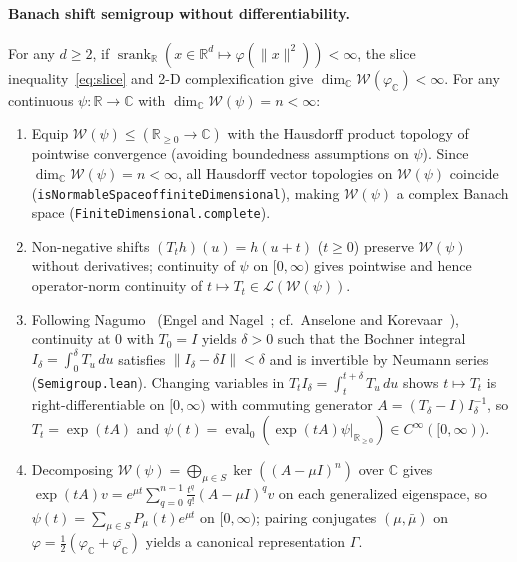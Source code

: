 \documentclass[11pt,a4paper]{article}
\theoremstyle{plain}
\theoremstyle{definition}
\newcommand{\R}{\mathbb{R}}
\newcommand{\C}{\mathbb{C}}
\newcommand{\Rnn}{\mathbb{R}_{\ge 0}}
\DeclareMathOperator{\srank}{srank}
\DeclareRobustCommand{\leanid}[1]{{\def\_{\textunderscore\allowbreak}\texttt{#1}}}
\begin{document}
\paragraph{Banach shift semigroup without differentiability.}
For any $d \ge 2$, if $\srank_{\R}(x \in \R^d \mapsto \varphi(\|x\|^2)) < \infty$, the slice inequality~\eqref{eq:slice} and 2-D complexification give $\dim_{\C}\mathcal{W}(\varphi_{\C}) < \infty$. For any continuous $\psi : \R \to \C$ with $\dim_{\C}\mathcal{W}(\psi) = n < \infty$:
\begin{enumerate}[leftmargin=2em,itemsep=2pt]
  \item Equip $\mathcal{W}(\psi) \le (\Rnn \to \C)$ with the Hausdorff product topology of pointwise convergence (avoiding boundedness assumptions on $\psi$). Since $\dim_{\C}\mathcal{W}(\psi) = n < \infty$, all Hausdorff vector topologies on $\mathcal{W}(\psi)$ coincide (\leanid{isNormableSpace\_of\_finiteDimensional}), making $\mathcal{W}(\psi)$ a complex Banach space (\leanid{FiniteDimensional.complete}).
  \item Non-negative shifts $(T_t h)(u) = h(u + t)$ ($t \ge 0$) preserve $\mathcal{W}(\psi)$ without derivatives; continuity of $\psi$ on $[0,\infty)$ gives pointwise and hence operator-norm continuity of $t \mapsto T_t \in \mathcal{L}(\mathcal{W}(\psi))$.
  \item Following Nagumo~\cite{nagumo1936einige} (Engel and Nagel~\cite[Thm.~I.3.7]{engel2000one}; cf.\ Anselone and Korevaar~\cite[p.~750]{anselone1964}), continuity at $0$ with $T_0 = I$ yields $\delta > 0$ such that the Bochner integral $I_\delta = \int_0^\delta T_u\,du$ satisfies $\|I_\delta - \delta I\| < \delta$ and is invertible by Neumann series (\texttt{Semigroup.lean}). Changing variables in $T_t I_\delta = \int_t^{t+\delta} T_u\,du$ shows $t \mapsto T_t$ is right-differentiable on $[0,\infty)$ with commuting generator $A = (T_\delta - I)I_\delta^{-1}$, so $T_t = \exp(tA)$ and $\psi(t) = \operatorname{eval}_0(\exp(tA)\psi|_{\Rnn}) \in C^\infty([0,\infty))$.
  \item Decomposing $\mathcal{W}(\psi) = \bigoplus_{\mu \in S} \ker((A - \mu I)^n)$ over $\C$ gives $\exp(tA)v = e^{\mu t}\sum_{q=0}^{n-1} \frac{t^q}{q!}(A - \mu I)^q v$ on each generalized eigenspace, so $\psi(t) = \sum_{\mu \in S} P_\mu(t)e^{\mu t}$ on $[0,\infty)$; pairing conjugates $(\mu, \bar\mu)$ on $\varphi = \frac{1}{2}(\varphi_{\C} + \overline{\varphi_{\C}})$ yields a canonical representation $\Gamma$.
\end{enumerate}
\end{document}
